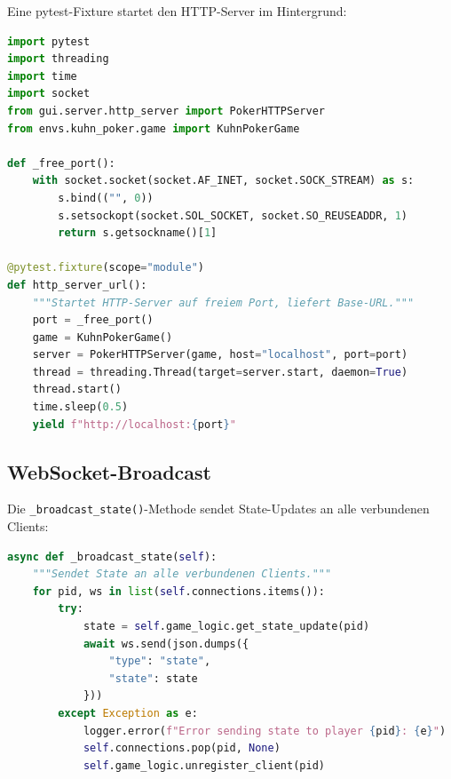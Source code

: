 Eine pytest-Fixture startet den HTTP-Server im Hintergrund:

\begin{lstlisting}[language=Python, caption={pytest-Fixture für HTTP-Server}]
import pytest
import threading
import time
import socket
from gui.server.http_server import PokerHTTPServer
from envs.kuhn_poker.game import KuhnPokerGame

def _free_port():
    with socket.socket(socket.AF_INET, socket.SOCK_STREAM) as s:
        s.bind(("", 0))
        s.setsockopt(socket.SOL_SOCKET, socket.SO_REUSEADDR, 1)
        return s.getsockname()[1]

@pytest.fixture(scope="module")
def http_server_url():
    """Startet HTTP-Server auf freiem Port, liefert Base-URL."""
    port = _free_port()
    game = KuhnPokerGame()
    server = PokerHTTPServer(game, host="localhost", port=port)
    thread = threading.Thread(target=server.start, daemon=True)
    thread.start()
    time.sleep(0.5)
    yield f"http://localhost:{port}"
\end{lstlisting}

\subsection{WebSocket-Broadcast}

Die \texttt{\_broadcast\_state()}-Methode sendet State-Updates an alle verbundenen Clients:

\begin{lstlisting}[language=Python, caption={WebSocket-Broadcast}]
async def _broadcast_state(self):
    """Sendet State an alle verbundenen Clients."""
    for pid, ws in list(self.connections.items()):
        try:
            state = self.game_logic.get_state_update(pid)
            await ws.send(json.dumps({
                "type": "state",
                "state": state
            }))
        except Exception as e:
            logger.error(f"Error sending state to player {pid}: {e}")
            self.connections.pop(pid, None)
            self.game_logic.unregister_client(pid)
\end{lstlisting}
